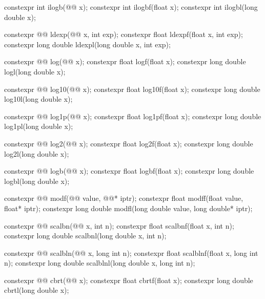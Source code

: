 \begin{codeblock}
{  constexpr int ilogb(@@ x);
  constexpr int ilogbf(float x);
  constexpr int ilogbl(long double x);

  constexpr @@ ldexp(@@ x, int exp);
  constexpr float               ldexpf(float x, int exp);
  constexpr long double         ldexpl(long double x, int exp);

  constexpr @@ log(@@ x);
  constexpr float               logf(float x);
  constexpr long double         logl(long double x);

  constexpr @@ log10(@@ x);
  constexpr float               log10f(float x);
  constexpr long double         log10l(long double x);

  constexpr @@ log1p(@@ x);
  constexpr float               log1pf(float x);
  constexpr long double         log1pl(long double x);

  constexpr @@ log2(@@ x);
  constexpr float               log2f(float x);
  constexpr long double         log2l(long double x);

  constexpr @@ logb(@@ x);
  constexpr float               logbf(float x);
  constexpr long double         logbl(long double x);

  constexpr @@ modf(@@ value, @@* iptr);
  constexpr float               modff(float value, float* iptr);
  constexpr long double         modfl(long double value, long double* iptr);

  constexpr @@ scalbn(@@ x, int n);
  constexpr float               scalbnf(float x, int n);
  constexpr long double         scalbnl(long double x, int n);

  constexpr @@ scalbln(@@ x, long int n);
  constexpr float               scalblnf(float x, long int n);
  constexpr long double         scalblnl(long double x, long int n);

  constexpr @@ cbrt(@@ x);
  constexpr float               cbrtf(float x);
  constexpr long double         cbrtl(long double x);

}
\end{codeblock}
